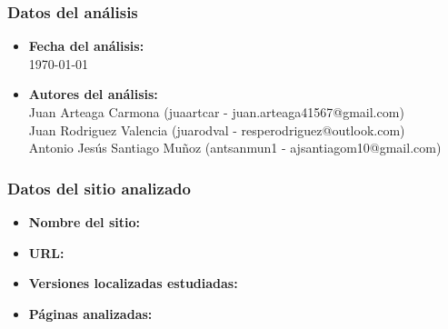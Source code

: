 \documentclass[a4paper,11pt]{article}
\begin{document}
\subsubsection{Datos del análisis}
\begin{itemize}
  \item \textbf{Fecha del análisis:}\\
  \today
  \item \textbf{Autores del análisis:}\\
   Juan Arteaga Carmona (juaartcar - juan.arteaga41567@gmail.com)\\
          Juan Rodriguez Valencia (juarodval - resperodriguez@outlook.com)\\
          Antonio Jesús Santiago Muñoz (antsanmun1 - ajsantiagom10@gmail.com)\\
\end{itemize}

\subsubsection{Datos del sitio analizado}
\begin{itemize}
\item \textbf{Nombre del sitio:}\\
\item \textbf{URL:}\\
\item \textbf{Versiones localizadas estudiadas:}\\
\item \textbf{Páginas analizadas:}\\
\end{itemize}
\end{document}
